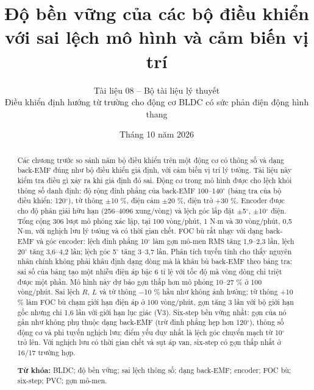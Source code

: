 \documentclass[11pt,a4paper]{article}
\title{\vspace{-1.2cm}\textbf{Độ bền vững của các bộ điều khiển với sai lệch mô hình và cảm biến vị trí}}
\author{\normalsize Tài liệu 08 -- Bộ tài liệu lý thuyết\\[2pt]
\small Điều khiển định hướng từ trường cho động cơ BLDC có sức phản điện động hình thang}
\date{\small Tháng 10 năm 2026}
\begin{document}
\maketitle

\begin{abstract}
\noindent Các chương trước so sánh năm bộ điều khiển trên một động cơ có thông số và dạng back-EMF đúng như bộ điều khiển giả định, với cảm biến vị trí lý tưởng. Tài liệu này kiểm tra điều gì xảy ra khi giả định đó sai. Động cơ trong mô hình được cho lệch khỏi thông số danh định: độ rộng đỉnh phẳng của back-EMF 100–140$^\circ$ (bảng tra của bộ điều khiển: 120$^\circ$), từ thông $\pm$10 \%, điện cảm $\pm$20 \%, điện trở +30 \%. Encoder được cho độ phân giải hữu hạn (256–4096 xung/vòng) và lệch góc lắp đặt $\pm$5$^\circ$, $\pm$10$^\circ$ điện. Tổng cộng 306 lượt mô phỏng xác lập, tại 100 vòng/phút, 1 N$\cdot$m và 30 vòng/phút, 0,5 N$\cdot$m, với nghịch lưu lý tưởng và có thời gian chết. FOC bù rất nhạy với dạng back-EMF và góc encoder: lệch đỉnh phẳng 10$^\circ$ làm gợn mô-men RMS tăng 1,9–2,3 lần, lệch 20$^\circ$ tăng 3,6–4,2 lần; lệch góc 5$^\circ$ tăng 3–3,7 lần. Phân tích tuyến tính cho thấy nguyên nhân chính không phải khâu định dạng dòng mà là khâu bù back-EMF theo bảng tra: sai số của bảng tạo một nhiễu điện áp bậc 6 tỉ lệ với tốc độ mà vòng dòng chỉ triệt được một phần. Mô hình này dự báo gợn thấp hơn mô phỏng 10–27 \% ở 100 vòng/phút. Sai lệch $R$, $L$ và từ thông −10 \% hầu như không ảnh hưởng; từ thông +10 \% làm FOC bù chạm giới hạn điện áp ở 100 vòng/phút, gợn tăng 3 lần với bộ giới hạn gốc nhưng chỉ 1,6 lần với giới hạn lục giác (V3). Six-step bền vững nhất: gợn của nó gần như không phụ thuộc dạng back-EMF (trừ đỉnh phẳng hẹp hơn 120$^\circ$), thông số động cơ và phi tuyến nghịch lưu; điểm yếu duy nhất là lệch góc chuyển mạch từ 10$^\circ$ trở lên. Với nghịch lưu có thời gian chết và sụt áp van, six-step có gợn thấp nhất ở 16/17 trường hợp.

\vspace{0.5em}
\noindent\textbf{Từ khóa:} BLDC; độ bền vững; sai lệch thông số; dạng back-EMF; encoder; FOC bù; six-step; PVC; gợn mô-men.
\end{abstract}


\tableofcontents
\newpage

\setcounter{section}{9}

\end{document}
